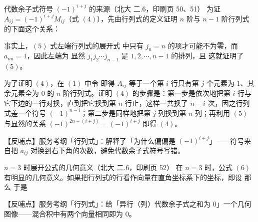 \begin{fdeep}{代数余子式符号 $(-1)^{i+j}$ 的来源（北大 二.6，印刷页 50、51）}
为证 $A_{ij}=(-1)^{i+j}M_{ij}$（式 $(4)$），先由行列式的定义证明 $n$ 阶与 $n-1$ 阶行列式的下面这个关系：

事实上，$(5)$ 式左端行列式的展开式
中只有 $j_n=n$ 的项才可能不为零，而 $a_{nn}=1$，因此左端为
显然 $j_1j_2\cdots j_{n-1}$ 是 $1,2,\cdots,n-1$ 的排列，且
这就证明了 $(5)$。

为了证明 $(4)$，在 $(1)$ 中令
即得 $A_{ij}$ 等于一个第 $i$ 行只有第 $j$ 个元素为 $1$、其余元素全为 $0$ 的 $n$ 阶行列式。证明 $(4)$ 的步骤是：第一步是依次地把第 $i$ 行与它下边的一行对换，直到把它换到第 $n$ 行止，这样一共换了 $n-i$ 次，因之行列式差一个符号 $(-1)^{n-i}$；第二步是同样地把第 $j$ 列换到第 $n$ 列；再利用 $(5)$ 与显然的关系 $(-1)^{2n-(i+j)}=(-1)^{i+j}$ 即得 $(4)$。

【反哺点】服务考纲「行列式」：解释了「为什么偏偏是 $(-1)^{i+j}$」——符号来自把 $a_{ij}$ 对换到右下角的次数，避免代数余子式符号写错。
\end{fdeep}

\begin{fdeep}{$n=3$ 时展开公式的几何意义（北大 二.6，印刷页 52）}
在 $n=3$ 时，公式 $(6)$ 有明显的几何意义。如果把行列式的行看作向量在直角坐标系下的坐标，即设
那么
于是

【反哺点】服务考纲「行列式」：给「异行（列）代数余子式之和为 0」一个几何图像——混合积中有两个向量相同即为 0。
\end{fdeep}

